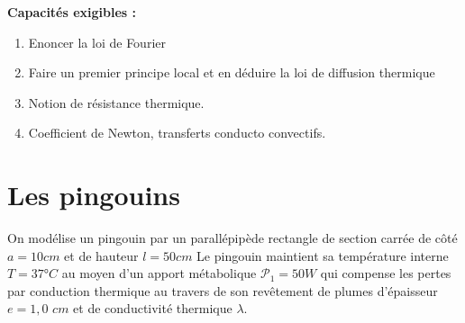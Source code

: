 \documentclass{article}
\begin{document}
\textbf{Capacités exigibles : }\\

\begin{enumerate}
  \item Enoncer la loi de Fourier
  \item Faire un premier principe local et en déduire la loi de diffusion thermique
  \item Notion de résistance thermique. 
  \item Coefficient de Newton, transferts conducto convectifs.  
\end{enumerate}

\section{Les pingouins}
On modélise un pingouin par un parallépipède rectangle de section carrée de côté $a=10cm$ et de hauteur $l = 50 cm$  Le pingouin maintient sa température interne $T = 37 $°$ C$ au moyen
d'un apport métabolique $\mathcal{P}_1 = 50 W $ qui compense les pertes par conduction thermique au
travers de son revêtement de plumes d'épaisseur $e = 1,0 $ $cm$ et de conductivité thermique $\lambda$.
\end{document}
